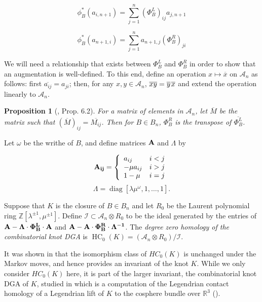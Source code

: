 \documentclass[11pt]{amsart}
\def\Z{{\mathbb Z}}
\def\R{{\mathbb R}}
\def\A{{\mathcal A}}
\newcommand\diag{\operatorname{diag}}
\newtheorem{prop}[thm]{Proposition}
\newenvironment{definition}[1][Definition]{\begin{trivlist}
\item[\hskip \labelsep {\bfseries #1}]}{\end{trivlist}}
\begin{document}
  $$\phi_B^*(a_{i,n+1}) = \sum_{j=1}^n(\Phi_B^L)_{ij}a_{j,n+1}$$

  $$\phi_B^*(a_{n+1,i}) = \sum_{j=1}^na_{n+1,j}(\Phi_B^R)_{ji}$$

  We will need a relationship that exists between $\Phi_B^L$ and $\Phi_B^R$ in order to show that an augmentation is well-defined. To this end, define an operation $x\mapsto\overline x$ on $\A_n$ as follows: first $\overline{a_{ij}}=a_{ji}$; then, for any $x,y\in\A_n$, $\overline{xy}=\overline y\hspace*{1pt}\overline x$ and extend the operation linearly to $\A_n$.
  \begin{prop}[\cite{Ng05}, Prop.\hspace*{-0.7pt} 6.2]For a matrix of elements in $\A_n$, let $\overline{M}$ be the matrix such that $\left(\overline M\right)_{ij} = \overline{M_{ij}}$. Then for $B\in B_n$, $\Phi_B^R$ is the transpose of $\overline{\Phi_B^L}$.
  \label{Prop:Transpose}
  \end{prop}

  Let $\omega$ be the writhe of $B$, and define matrices $\bf{A}$ and $\Lambda$ by

  \begin{equation}
  \bf{A}_{ij} = 
  \left\{
       \begin{array}{lr}
        a_{ij} & i<j\\
        -\mu a_{ij} & i>j\\
        1-\mu & i = j\\
       \end{array}
  \right.
  \label{def:Amatrix}
  \end{equation}
  \begin{equation}
  \Lambda = \diag[\lambda\mu^\omega,1,\ldots,1].
  \label{defn:Lambda}
  \end{equation}

  \begin{definition}
  Suppose that $K$ is the closure of $B\in B_n$ and let $R_0$ be the Laurent polynomial ring $\Z[\lambda^{\pm 1},\mu^{\pm 1}]$. Define $\mathcal{I}\subset \A_n\otimes R_0$ to be the ideal generated by the entries of $\bf{A} - \Lambda\cdot\Phi_B^L\cdot \bf{A}$ and $\bf{A} - \bf{A}\cdot\Phi_B^R\cdot\Lambda^{-1}$.  The \emph{degree zero homology of the combinatorial knot DGA} is $\operatorname{HC}_0(K) = (\A_n\otimes R_0)/\mathcal{I}$.
  \label{defn:HC_0}
  \end{definition}
  It was shown in \cite{Ng08} that the isomorphism class of $HC_0(K)$ is unchanged under the Markov moves, and hence provides an invariant of the knot $K$. While we only consider $HC_0(K)$ here, it is part of the larger invariant, the combinatorial knot DGA of $K$, studied in \cite{Ng08} which is a computation of the Legendrian contact homology of a Legendrian lift of $K$ to the cosphere bundle over $\R^3$ (\cite{EENS12}).
\end{document}
